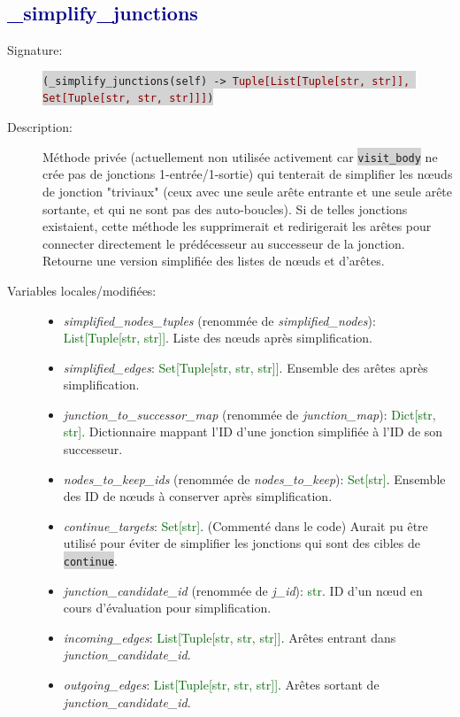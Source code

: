\documentclass[11pt,a4paper]{article}
\newcommand{\code}[1]{\colorbox{lightgray}{\texttt{\small #1}}}
\newcommand{\var}[1]{\textit{#1}}
\newcommand{\vartype}[1]{\textcolor{darkgreen}{#1}}
\newcommand{\methodname}[1]{\textbf{\textcolor{darkblue}{#1}}}
\newcommand{\rettype}[1]{\textcolor{darkred}{#1}}
\begin{document}
\subsection*{\methodname{\_simplify\_junctions}}
\begin{description}
    \item[Signature:] \code{(\_simplify\_junctions(self) -> \rettype{Tuple[List[Tuple[str, str]], Set[Tuple[str, str, str]]]})}
    \item[Description:] Méthode privée (actuellement non utilisée activement car \code{visit\_body} ne crée pas de jonctions 1-entrée/1-sortie) qui tenterait de simplifier les nœuds de jonction "triviaux" (ceux avec une seule arête entrante et une seule arête sortante, et qui ne sont pas des auto-boucles). Si de telles jonctions existaient, cette méthode les supprimerait et redirigerait les arêtes pour connecter directement le prédécesseur au successeur de la jonction. Retourne une version simplifiée des listes de nœuds et d'arêtes.
    \item[Variables locales/modifiées:]
    \begin{itemize}
        \item \var{simplified\_nodes\_tuples} (renommée de \var{simplified\_nodes}): \vartype{List[Tuple[str, str]]}. Liste des nœuds après simplification.
        \item \var{simplified\_edges}: \vartype{Set[Tuple[str, str, str]]}. Ensemble des arêtes après simplification.
        \item \var{junction\_to\_successor\_map} (renommée de \var{junction\_map}): \vartype{Dict[str, str]}. Dictionnaire mappant l'ID d'une jonction simplifiée à l'ID de son successeur.
        \item \var{nodes\_to\_keep\_ids} (renommée de \var{nodes\_to\_keep}): \vartype{Set[str]}. Ensemble des ID de nœuds à conserver après simplification.
        \item \var{continue\_targets}: \vartype{Set[str]}. (Commenté dans le code) Aurait pu être utilisé pour éviter de simplifier les jonctions qui sont des cibles de \code{continue}.
        \item \var{junction\_candidate\_id} (renommée de \var{j\_id}): \vartype{str}. ID d'un nœud en cours d'évaluation pour simplification.
        \item \var{incoming\_edges}: \vartype{List[Tuple[str, str, str]]}. Arêtes entrant dans \var{junction\_candidate\_id}.
        \item \var{outgoing\_edges}: \vartype{List[Tuple[str, str, str]]}. Arêtes sortant de \var{junction\_candidate\_id}.

\end{itemize}
\end{description}
\end{document}
